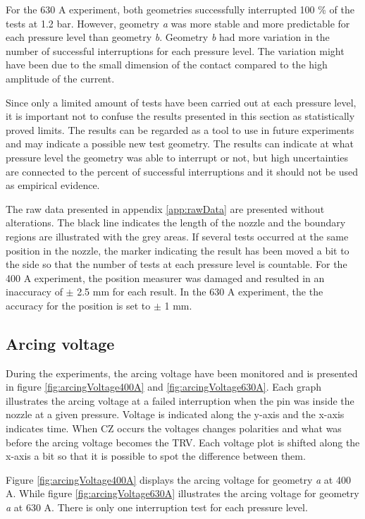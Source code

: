 \documentclass[10pt,a4paper,twoside]{article}
\begin{document}
For the 630 A experiment, both geometries successfully interrupted 100 \% of the tests at 1.2 bar. However, geometry \textit{a} was more stable and more predictable for each pressure level than geometry \textit{b}. Geometry \textit{b} had more variation in the number of successful interruptions for each pressure level. The variation might have been due to the small dimension of the contact compared to the high amplitude of the current.

Since only a limited amount of tests have been carried out at each pressure level, it is important not to confuse the results presented in this section as statistically proved limits. The results can be regarded as a tool to use in future experiments and may indicate a possible new test geometry. The results can indicate at what pressure level the geometry was able to interrupt or not, but high uncertainties are connected to the percent of successful interruptions and it should not be used as empirical evidence.

The raw data presented in appendix \ref{app:rawData} are presented without alterations. The black line indicates the length of the nozzle and the boundary regions are illustrated with the grey areas. If several tests occurred at the same position in the nozzle, the marker indicating the result has been moved a bit to the side so that the number of tests at each pressure level is countable. For the 400 A experiment, the position measurer was damaged and resulted in an inaccuracy of $\pm$ 2.5 mm for each result. In the 630 A experiment, the the accuracy for the position is set to $\pm$ 1 mm.

\newpage
\subsection{Arcing voltage}
During the experiments, the arcing voltage have been monitored and is presented in figure \ref{fig:arcingVoltage400A} and \ref{fig:arcingVoltage630A}. Each graph illustrates the arcing voltage at a failed interruption when the pin was inside the nozzle at a given pressure. Voltage is indicated along the y-axis and the x-axis indicates time. When CZ occurs the voltages changes polarities and what was before the arcing voltage becomes the TRV. Each voltage plot is shifted along the x-axis a bit so that it is possible to spot the difference between them.

Figure \ref{fig:arcingVoltage400A} displays the arcing voltage for geometry \textit{a} at 400 A. While figure \ref{fig:arcingVoltage630A} illustrates the arcing voltage for geometry \textit{a} at 630 A. There is only one interruption test for each pressure level.
\end{document}
